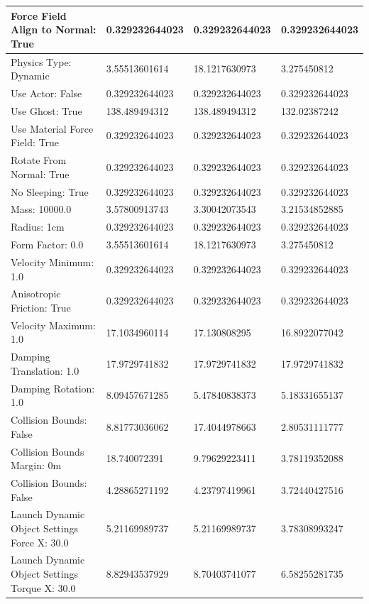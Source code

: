 \begin{table}[htbp]
\begin{tabular}{ | l || l | l | l | }
Force Field Align to Normal: True & 0.329232644023  & 0.329232644023  & 0.329232644023 \\ \hline
Physics Type: Dynamic & 3.55513601614  & 18.1217630973  & 3.275450812 \\ \hline
\rowcolor{cyan}
Use Actor: False & 0.329232644023  & 0.329232644023  & 0.329232644023 \\ \hline
Use Ghost: True & 138.489494312  & 138.489494312  & 132.02387242 \\ \hline
\rowcolor{cyan}
Use Material Force Field: True & 0.329232644023  & 0.329232644023  & 0.329232644023 \\ \hline
\rowcolor{cyan}
Rotate From Normal: True & 0.329232644023  & 0.329232644023  & 0.329232644023 \\ \hline
\rowcolor{cyan}
No Sleeping: True & 0.329232644023  & 0.329232644023  & 0.329232644023 \\ \hline
Mass: 10000.0 & 3.57800913743  & 3.30042073543  & 3.21534852885 \\ \hline
\rowcolor{cyan}
Radius: 1cm & 0.329232644023  & 0.329232644023  & 0.329232644023 \\ \hline
Form Factor: 0.0 & 3.55513601614  & 18.1217630973  & 3.275450812 \\ \hline
\rowcolor{cyan}
Velocity Minimum: 1.0 & 0.329232644023  & 0.329232644023  & 0.329232644023 \\ \hline
\rowcolor{cyan}
Anisotropic Friction: True & 0.329232644023  & 0.329232644023  & 0.329232644023 \\ \hline
Velocity Maximum: 1.0 & 17.1034960114  & 17.130808295  & 16.8922077042 \\ \hline
Damping Translation: 1.0 & 17.9729741832 & 17.9729741832 & 17.9729741832 \\ \hline
Damping Rotation: 1.0 & 8.09457671285 & 5.47840838373 & 5.18331655137 \\ \hline
Collision Bounds: False & 8.81773036062 & 17.4044978663 & 2.80531111777 \\ \hline
Collision Bounds Margin: 0m & 18.740072391  & 9.79629223411  & 3.78119352088 \\ \hline
Collision Bounds: False & 4.28865271192  & 4.23797419961  & 3.72440427516 \\ \hline
Launch Dynamic Object Settings Force X: 30.0 & 5.21169989737  & 5.21169989737  & 3.78308993247 \\ \hline
Launch Dynamic Object Settings Torque X: 30.0 & 8.82943537929  & 8.70403741077  & 6.58255281735 \\ \hline

\end{tabular}
\end{table}
